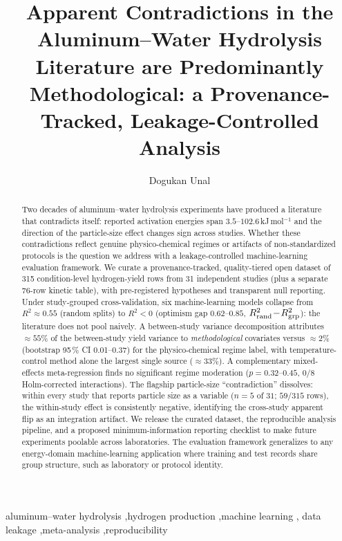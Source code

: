 \documentclass[preprint,12pt]{elsarticle}
\begin{document}
\begin{frontmatter}

\title{Apparent Contradictions in the Aluminum--Water Hydrolysis Literature
are Predominantly Methodological: a Provenance-Tracked, Leakage-Controlled Analysis}

\author[a]{Dogukan Unal}

\begin{abstract}
\noindent Two decades of aluminum--water hydrolysis experiments have produced a literature
that contradicts itself: reported activation energies span $3.5$--$102.6$\,kJ\,mol$^{-1}$
and the direction of the particle-size effect changes sign across studies. Whether these
contradictions reflect genuine physico-chemical regimes or artifacts of non-standardized
protocols is the question we address with a leakage-controlled machine-learning evaluation
framework. We curate a provenance-tracked, quality-tiered open dataset of 315 condition-level
hydrogen-yield rows from 31 independent studies (plus a separate 76-row kinetic table), with
pre-registered hypotheses and transparent null reporting. Under study-grouped cross-validation,
six machine-learning models collapse from $R^2\!\approx\!0.55$ (random splits)
to $R^2<0$ (optimism gap $0.62$--$0.85$, $R^2_{\rm rand}\!-\!R^2_{\rm grp}$): the literature does not pool naively. A
between-study variance decomposition attributes $\approx\!55\%$ of the between-study
yield variance to \emph{methodological} covariates versus $\approx\!2\%$
(bootstrap 95\,\% CI 0.01--0.37) for the physico-chemical regime label,
with temperature-control method alone the largest single
source ($\approx\!33\%$). A complementary mixed-effects meta-regression finds no significant
regime moderation ($p=0.32$--$0.45$, $0/8$ Holm-corrected interactions). The flagship
particle-size ``contradiction'' dissolves: within every study that reports particle size
as a variable ($n\!=\!5$ of $31$; $59/315$ rows), the within-study effect is consistently
negative, identifying the cross-study
apparent flip as an integration artifact. We release the curated dataset, the reproducible
analysis pipeline, and a proposed minimum-information reporting checklist to make future
experiments poolable across laboratories. The evaluation framework generalizes to any
energy-domain machine-learning application where training and test records share group
structure, such as laboratory or protocol identity.
\end{abstract}

\begin{keyword}
aluminum--water hydrolysis \sep hydrogen production \sep machine learning \sep
data leakage \sep meta-analysis \sep reproducibility
\end{keyword}

\end{frontmatter}
\end{document}
